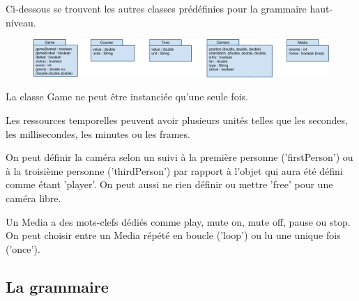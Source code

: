 Ci-dessous se trouvent les autres classes prédéfinies pour la grammaire haut-niveau.

\begin{figure}[h]
 \centering
 \includegraphics[width=\textwidth]{img/otherclass}
\end{figure}

La classe Game ne peut être instanciée qu'une seule fois.

Les ressources temporelles peuvent avoir plusieurs unités telles que les secondes, les millisecondes, les minutes ou les frames.

On peut définir la caméra selon un suivi à la première personne ('firstPerson') ou à la troisième personne ('thirdPerson') par rapport 
à l'objet qui aura été défini comme étant 'player'.
On peut aussi ne rien définir ou mettre 'free' pour une caméra libre.

Un Media a des mots-clefs dédiés comme play, mute on, mute off, pause ou stop.
On peut choisir entre un Media répété en boucle ('loop') ou lu une unique fois ('once').

\subsection{La grammaire}


